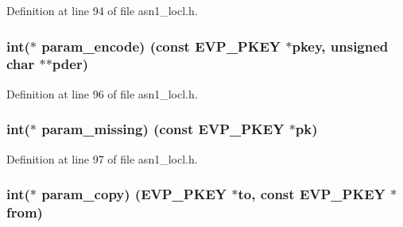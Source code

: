 Definition at line 94 of file asn1\+\_\+locl.\+h.

\subsubsection[{\texorpdfstring{param\+\_\+encode}{param_encode}}]{\setlength{\rightskip}{0pt plus 5cm}int($\ast$ param\+\_\+encode) (const {\bf E\+V\+P\+\_\+\+P\+K\+EY} $\ast$pkey, unsigned char $\ast$$\ast$pder)}\hypertarget{structevp__pkey__asn1__method__st_a04f0d748ac0849729c38b9a9973a4698}{}\label{structevp__pkey__asn1__method__st_a04f0d748ac0849729c38b9a9973a4698}


Definition at line 96 of file asn1\+\_\+locl.\+h.

\subsubsection[{\texorpdfstring{param\+\_\+missing}{param_missing}}]{\setlength{\rightskip}{0pt plus 5cm}int($\ast$ param\+\_\+missing) (const {\bf E\+V\+P\+\_\+\+P\+K\+EY} $\ast$pk)}\hypertarget{structevp__pkey__asn1__method__st_a94201cf3615668ed541102f82c228444}{}\label{structevp__pkey__asn1__method__st_a94201cf3615668ed541102f82c228444}


Definition at line 97 of file asn1\+\_\+locl.\+h.

\subsubsection[{\texorpdfstring{param\+\_\+copy}{param_copy}}]{\setlength{\rightskip}{0pt plus 5cm}int($\ast$ param\+\_\+copy) ({\bf E\+V\+P\+\_\+\+P\+K\+EY} $\ast$to, const {\bf E\+V\+P\+\_\+\+P\+K\+EY} $\ast$from)}\hypertarget{structevp__pkey__asn1__method__st_a401a3075117e31f3ecb4c8fe56a7ea1e}{}\label{structevp__pkey__asn1__method__st_a401a3075117e31f3ecb4c8fe56a7ea1e}


